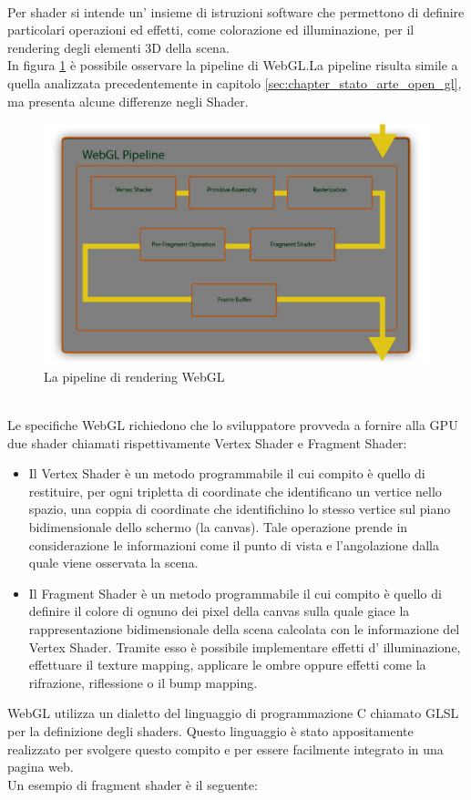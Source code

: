 \\
Per shader si intende un’ insieme di istruzioni software che permettono di definire particolari operazioni ed effetti, come colorazione ed illuminazione, per il rendering degli elementi 3D della scena.
\\
In figura \ref{fig:tecnologie_abilitanti_webglrender}  è possibile osservare la pipeline di WebGL.La pipeline risulta simile a quella analizzata precedentemente in capitolo \ref{sec:chapter_stato_arte_open_gl}, ma presenta alcune differenze negli Shader.
\\
\begin{figure}[htb]
 \centering
 \includegraphics[width=0.9\linewidth]{images/chapter_tecnologie_abilitanti/tecnologie_abilitanti_webglrender.png}\hfill
 \caption[La pipeline di WebGL]{La pipeline di rendering WebGL}
 \label{fig:tecnologie_abilitanti_webglrender}
\end{figure}
\\
Le specifiche WebGL richiedono che lo sviluppatore provveda a fornire alla GPU due shader chiamati rispettivamente Vertex Shader e Fragment Shader:
\begin{itemize}
\item Il Vertex Shader è un metodo programmabile il cui compito è quello di restituire, per ogni tripletta di coordinate che identificano un vertice nello spazio, una coppia di coordinate che identifichino lo stesso vertice sul piano bidimensionale dello schermo (la canvas). Tale operazione prende in considerazione le informazioni come il punto di vista e l’angolazione dalla quale viene osservata la scena.
\item Il Fragment Shader è un metodo programmabile il cui compito è quello di definire il colore di ognuno dei pixel della canvas sulla quale giace la rappresentazione bidimensionale della scena calcolata con le informazione del Vertex Shader. Tramite esso è possibile implementare effetti d’ illuminazione, effettuare il texture mapping, applicare le ombre oppure effetti come la rifrazione, riflessione o il bump mapping.
\end{itemize}
WebGL utilizza un dialetto del linguaggio di programmazione C chiamato GLSL per la definizione degli shaders. Questo linguaggio è stato appositamente realizzato per svolgere questo compito e per essere facilmente integrato in una pagina web.
\\
Un esempio di fragment shader è il seguente:


